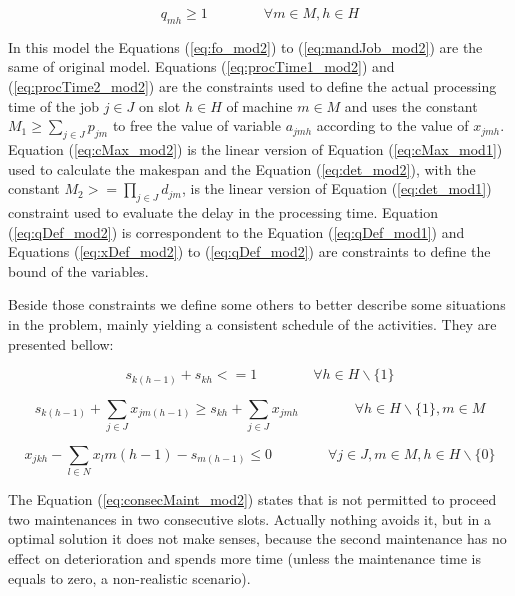 \documentclass[a4paper,11pt]{article}
\begin{document}
\begin{equation}\label{eq:qDef_mod2}
    q_{mh} \geq 1 \quad \quad \quad \quad \forall  m \in M, h \in H
\end{equation}

In this model the Equations (\ref{eq:fo_mod2}) to (\ref{eq:mandJob_mod2}) are the same of original model. Equations (\ref{eq:procTime1_mod2}) and (\ref{eq:procTime2_mod2}) are the constraints used to define the actual processing time of the job $j \in J$ on slot $h \in H$ of machine $m \in M$ and uses the constant $M_1 \geq \sum_{j \in J}{p_{jm}}$ to free the value of variable $a_{jmh}$ according to the value of $x_{jmh}$. Equation (\ref{eq:cMax_mod2}) is the linear version of Equation (\ref{eq:cMax_mod1}) used to calculate the makespan and the Equation (\ref{eq:det_mod2}), with the constant $M_2 >= \prod_{j \in J}{d_{jm}}$, is the linear version of Equation (\ref{eq:det_mod1}) constraint used to evaluate the delay in the processing time. Equation (\ref{eq:qDef_mod2}) is correspondent to the Equation (\ref{eq:qDef_mod1}) and Equations (\ref{eq:xDef_mod2}) to (\ref{eq:qDef_mod2}) are constraints to define the bound of the variables.

Beside those constraints we define some others to better describe some situations in the problem, mainly yielding a consistent schedule of the activities. They are presented bellow:

\begin{equation}\label{eq:consecMaint_mod2}
	s_{k(h-1)} + s_{kh} <= 1  \quad \quad \quad \quad \forall h \in H\backslash\{1\}
\end{equation}

\begin{equation}\label{eq:consecSlot1_mod2}
	s_{k(h-1)} + \sum_{j \in J}{x_{jm(h-1)}} \geq 	s_{kh} + \sum_{j \in J}{x_{jmh}}  \quad \quad \quad \quad \forall h \in H\backslash\{1\}, m \in M
\end{equation}

\begin{equation}\label{eq:consecSlot2_mod2}
	x_{jkh} - \sum_{l \in N}{x_lm(h-1)} - s_{m(h-1)} \leq 0    \quad \quad \quad \quad \forall j \in J, m \in M, h \in H\backslash\{0\}
\end{equation}

The Equation (\ref{eq:consecMaint_mod2}) states that is not permitted to proceed two maintenances in two consecutive slots. Actually nothing avoids it, but in a optimal solution it does not make senses, because the second maintenance has no effect on deterioration and spends more time (unless the maintenance time is equals to zero, a non-realistic scenario). 
\end{document}
